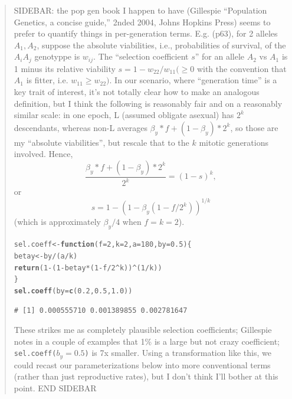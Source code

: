 \documentclass{article}\usepackage[]{graphicx}\usepackage[]{color}
\makeatletter
\newcommand{\hlnum}[1]{\textcolor[rgb]{0.686,0.059,0.569}{#1}}%
\newcommand{\hlopt}[1]{\textcolor[rgb]{0,0,0}{#1}}%
\newcommand{\hlstd}[1]{\textcolor[rgb]{0.345,0.345,0.345}{#1}}%
\newcommand{\hlkwa}[1]{\textcolor[rgb]{0.161,0.373,0.58}{\textbf{#1}}}%
\newcommand{\hlkwb}[1]{\textcolor[rgb]{0.69,0.353,0.396}{#1}}%
\newcommand{\hlkwc}[1]{\textcolor[rgb]{0.333,0.667,0.333}{#1}}%
\newcommand{\hlkwd}[1]{\textcolor[rgb]{0.737,0.353,0.396}{\textbf{#1}}}%
\newenvironment{kframe}{%
 \def\at@end@of@kframe{}%
 \ifinner\ifhmode%
  \def\at@end@of@kframe{\end{minipage}}%
  \begin{minipage}{\columnwidth}%
 \fi\fi%
 \def\FrameCommand##1{\hskip\@totalleftmargin \hskip-\fboxsep
 \colorbox{shadecolor}{##1}\hskip-\fboxsep
     \hskip-\linewidth \hskip-\@totalleftmargin \hskip\columnwidth}%
 \MakeFramed {\advance\hsize-\width
   \@totalleftmargin\z@ \linewidth\hsize
   \@setminipage}}%
 {\par\unskip\endMakeFramed%
 \at@end@of@kframe}
\newenvironment{knitrout}{}{} %
\makeatother
\begin{document}
\begin{quote} 
  SIDEBAR: the pop gen book I happen to have (Gillespie ``Population Genetics, a concise guide,''
  2nded 2004, Johns Hopkins Press) seems to prefer to quantify things in per-generation terms.
  E.g. (p63), for 2 alleles $A_1, A_2$, suppose the absolute viabilities, i.e., probabilities of
  survival, of the $A_iA_j$ genotyppe is $w_{ij}$.  The ``selection coefficient $s$'' for an allele
  $A_2$ vs $A_1$ is 1 minus its relative viability $s=1-w_{22}/w_{11} ( \ge 0$ with the convention
  that $A_1$ is fitter, i.e. $w_{11} \ge w_{22})$.  In our scenario, where ``generation time'' is a
  key trait of interest, it's not totally clear how to make an analogous definition, but I think the
  following is reasonably fair and on a reasonably similar scale: in one epoch, L (assumed obligate
  asexual) has $2^k$ descendants, whereas non-L averages $\beta_y*f + (1-\beta_y)*2^k$, so those are
  my ``absolute viabilities'', but rescale that to the $k$ mitotic generations involved.
  Hence, $$\frac{\beta_y*f + (1-\beta_y)*2^k}{2^k} = (1-s)^k,$$
  or $$s=1-\left(1-\beta_y(1-f/2^k)\right)^{1/k}$$ (which is approximately $\beta_y/4$ when
  $f=k=2$).

\begin{knitrout}\footnotesize
{}\color{fgcolor}\begin{kframe}
\begin{alltt}
\hlstd{sel.coeff} \hlkwb{<-} \hlkwa{function}\hlstd{(}\hlkwc{f}\hlstd{=}\hlnum{2}\hlstd{,} \hlkwc{k}\hlstd{=}\hlnum{2}\hlstd{,} \hlkwc{a}\hlstd{=}\hlnum{180}\hlstd{,} \hlkwc{by}\hlstd{=}\hlnum{0.5}\hlstd{)\{}
  \hlstd{betay} \hlkwb{<-} \hlstd{by}\hlopt{/}\hlstd{(a}\hlopt{/}\hlstd{k)}
  \hlkwd{return}\hlstd{(}\hlnum{1}\hlopt{-}\hlstd{(}\hlnum{1}\hlopt{-}\hlstd{betay}\hlopt{*}\hlstd{(}\hlnum{1}\hlopt{-}\hlstd{f}\hlopt{/}\hlnum{2}\hlopt{^}\hlstd{k))}\hlopt{^}\hlstd{(}\hlnum{1}\hlopt{/}\hlstd{k))}
\hlstd{\}}
\hlkwd{sel.coeff}\hlstd{(}\hlkwc{by}\hlstd{=}\hlkwd{c}\hlstd{(}\hlnum{0.2}\hlstd{,} \hlnum{0.5}\hlstd{,} \hlnum{1.0}\hlstd{))}
\end{alltt}
\begin{verbatim}
# [1] 0.000555710 0.001389855 0.002781647
\end{verbatim}
\end{kframe}
\end{knitrout}

  These strikes me as completely plausible selection coefficients; Gillespie notes in a couple of
  examples that 1\% is a large but not crazy coefficient; \texttt{sel.coeff($b_y=0.5$)} is 7x smaller.
  Using a transformation like this, we could recast our parameterizations below into more conventional
  terms (rather than just reproductive rates), but I don't think I'll bother at this point.  END
  SIDEBAR
\end{quote}
\end{document}
